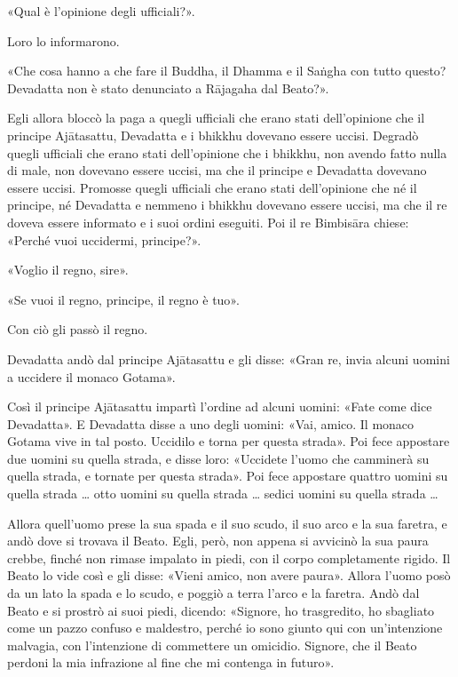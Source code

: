 «Qual è l’opinione degli ufficiali?».


Loro lo informarono.


«Che cosa hanno a che fare il Buddha, il Dhamma e il Saṅgha con tutto
questo? Devadatta non è stato denunciato a Rājagaha dal Beato?».


Egli allora bloccò la paga a quegli ufficiali che erano stati
dell’opinione che il principe Ajātasattu, Devadatta e i bhikkhu dovevano
essere uccisi. Degradò quegli ufficiali che erano stati dell’opinione
che i bhikkhu, non avendo fatto nulla di male, non dovevano essere
uccisi, ma che il principe e Devadatta dovevano essere uccisi. Promosse
quegli ufficiali che erano stati dell’opinione che né il principe, né
Devadatta e nemmeno i bhikkhu dovevano essere uccisi, ma che il re
doveva essere informato e i suoi ordini eseguiti. Poi il re Bimbisāra
chiese: «Perché vuoi uccidermi, principe?».


«Voglio il regno, sire».


«Se vuoi il regno, principe, il regno è tuo».


Con ciò gli passò il regno.


Devadatta andò dal principe Ajātasattu e gli disse: «Gran re, invia
alcuni uomini a uccidere il monaco Gotama».


Così il principe Ajātasattu impartì l’ordine ad alcuni uomini: «Fate
come dice Devadatta». E Devadatta disse a uno degli uomini: «Vai, amico.
Il monaco Gotama vive in tal posto. Uccidilo e torna per questa strada».
Poi fece appostare due uomini su quella strada, e disse loro: «Uccidete
l’uomo che camminerà su quella strada, e tornate per questa strada». Poi
fece appostare quattro uomini su quella strada … otto uomini su quella
strada … sedici uomini su quella strada …


Allora quell’uomo prese la sua spada e il suo scudo, il suo arco e la
sua faretra, e andò dove si trovava il Beato. Egli, però, non appena si
avvicinò la sua paura crebbe, finché non rimase impalato in piedi, con
il corpo completamente rigido. Il Beato lo vide così e gli disse: «Vieni
amico, non avere paura». Allora l’uomo posò da un lato la spada e lo
scudo, e poggiò a terra l’arco e la faretra. Andò dal Beato e si prostrò
ai suoi piedi, dicendo: «Signore, ho trasgredito, ho sbagliato come un
pazzo confuso e maldestro, perché io sono giunto qui con un’intenzione
malvagia, con l’intenzione di commettere un omicidio. Signore, che il
Beato perdoni la mia infrazione al fine che mi contenga in futuro».


